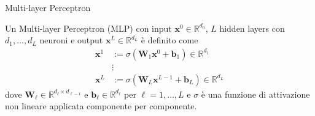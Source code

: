 \documentclass{beamer}
\newcommand{\numberset}{\mathbb}
\newcommand{\R}{\numberset{R}}
\begin{document}
\begin{frame}{Multi-layer Perceptron}
 \begin{definition}
  Un Multi-layer Perceptron (MLP) con input $\mathbf{x}^{0}\in \R^{d_{0}}$, $L$ hidden layers con $d_{1}, \ldots, d_{L}$ neuroni e output $\mathbf{x}^{L}\in \R^{d_{L}}$ è definito come
    \begin{align*}
     \mathbf{x}^{1} &:= \sigma\left( \mathbf{W}_{1} \mathbf{x}^{0} + \mathbf{b}_{1} \right) \in \R^{d_{1}} \\
     &\vdots \\
     \mathbf{x}^{L} &:= \sigma\left( \mathbf{W}_{L} \mathbf{x}^{L-1} + \mathbf{b}_{L} \right) \in \R^{d_{L}}
    \end{align*}
    dove $\mathbf{W}_{\ell}\in \R^{d_{\ell}\times d_{\ell-1}}$ e $\mathbf{b}_{\ell}\in \R^{d_{\ell}}$ per $\ell=1,\ldots, L$ e $\sigma$ è una funzione di attivazione non lineare applicata componente per componente.
 \end{definition}
\end{frame}
\end{document}
